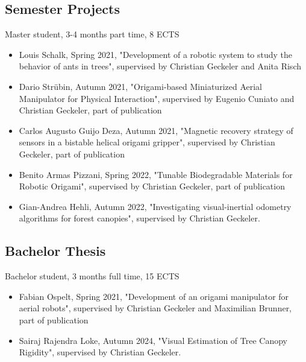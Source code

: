 \subsection{Semester Projects}
Master student, 3-4 months part time, 8 ECTS
\begin{itemize}
    \item Louis Schalk, Spring 2021, "Development of a robotic system to study the behavior of ants in trees", supervised by Christian Geckeler and Anita Risch

    \item Dario Strübin, Autumn 2021, "Origami-based Miniaturized Aerial Manipulator for Physical Interaction", supervised by Eugenio Cuniato and Christian Geckeler, part of publication \cite{Cuniato2023}

    \item Carlos Augusto Guijo Deza, Autumn 2021, "Magnetic recovery strategy of sensors in a bistable helical origami gripper", supervised by Christian Geckeler, part of publication \cite{Geckeler2022a}

    \item Benito Armas Pizzani, Spring 2022, "Tunable Biodegradable Materials for Robotic Origami", supervised by Christian Geckeler, part of publication \cite{Geckeler2023b}

    \item Gian-Andrea Hehli, Autumn 2022, "Investigating visual-inertial odometry algorithms for forest canopies", supervised by Christian Geckeler.
\end{itemize}

\subsection{Bachelor Thesis}
Bachelor student, 3 months full time, 15 ECTS %

\begin{itemize}
  \item Fabian Ospelt, Spring 2021, "Development of an origami manipulator for aerial robots", supervised by Christian Geckeler and Maximilian Brunner, part of publication \cite{Cuniato2023}

  \item Sairaj Rajendra Loke, Autumn 2024, "Visual Estimation of Tree Canopy Rigidity", supervised by Christian Geckeler.
\end{itemize}




